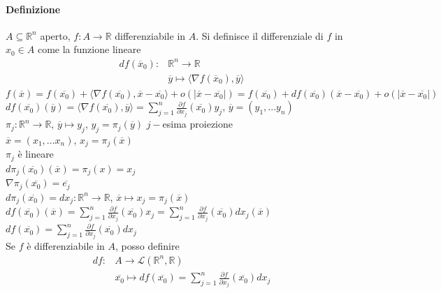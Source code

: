 \documentclass{article}
\newcommand{\R}{\mathbb{R}}
\begin{document}
\paragraph{Definizione}
$A \subseteq \R^n$ aperto, $f:A \rightarrow \R$ differenziabile in $A$. Si definisce il differenziale di $f$ in $x_0 \in A$ come la funzione lineare 
\begin{align*}
    df(\overline{x}_0):&\R^n\rightarrow\R\\
    &\overline{y}\mapsto \langle \nabla f(\overline{x}_0),\overline{y} \rangle
\end{align*}
$f(\overline{x})=f(\overline{x_0})+\langle \nabla f (\overline{x_0}),\overline{x}-\overline{x_0} \rangle + o(|\overline{x}-\overline{x_0}|)=f(\overline{x_0})+df(\overline{x_0})(\overline{x}-\overline{x_0})+o(|\overline{x}-\overline{x_0}|)$\\
$df(\overline{x_0})(\overline{y})=\langle \nabla f (\overline{x_0}),\overline{y}\rangle =\sum_{j=1}^n\frac{\partial f}{\partial x_j}(\overline{x_0})y_j$, $\overline{y}=(y_1,...y_n)$\\
$\pi_j: \R^n \rightarrow \R$, $\overline{y}\mapsto y_j$, $y_j=\pi_j(\overline{y})$ $j-$esima proiezione\\
$\overline{x}=(x_1,...x_n)$, $x_j=\pi_j(\overline{x})$\\
$\pi_j$ è lineare\\
$d \pi_j (\overline{x_0})(\overline{x})=\pi_j(x)=x_j$\\
$\nabla \pi_j (\overline{x_0})=\overline{e_j}$\\
$d \pi _j (\overline{x_0})=dx_j: \R^n \rightarrow \R$, $\overline{x} \mapsto x_j=\pi_j(\overline{x})$\\
$df(\overline{x_0})(\overline{x})=\sum_{j=1}^n \frac{\partial f}{\partial x_j}(\overline{x_0})x_j=\sum_{j=1}^n \frac{\partial f}{\partial x_j}(\overline{x_0})dx_j(\overline{x})$\\
$df(\overline{x_0})=\sum_{j=1}^n \frac{\partial f}{\partial x_j} (\overline{x_0})dx_j$\\
Se $f$ è differenziabile in $A$, posso definire
\begin{align*}
    df: &A \rightarrow \mathcal{L}(\R^n,\R)\\
    &\overline{x_0} \mapsto df(\overline{x_0})=\sum_{j=1}^n \frac{\partial f}{\partial x_j}(\overline{x_0})dx_j
\end{align*}
\end{document}
